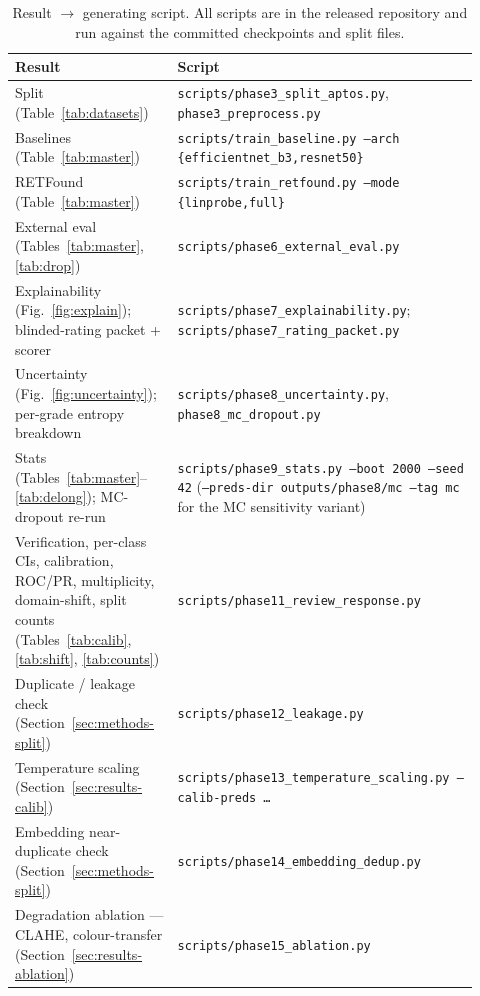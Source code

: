 \documentclass[journal]{IEEEtran}
\begin{document}
\begin{table}[!t]
\centering\footnotesize
\caption{Result $\rightarrow$ generating script. All scripts are in the released
repository and run against the committed checkpoints and split files.}
\label{tab:repro}
\setlength{\tabcolsep}{4pt}
\begin{tabular}{@{}p{0.30\linewidth} p{0.62\linewidth}@{}}
\toprule
Result & Script \\
\midrule
Split (Table~\ref{tab:datasets}) & \texttt{scripts/phase3\_split\_aptos.py}, \texttt{phase3\_preprocess.py} \\
Baselines (Table~\ref{tab:master}) & \texttt{scripts/train\_baseline.py --arch \{efficientnet\_b3,resnet50\}} \\
RETFound (Table~\ref{tab:master}) & \texttt{scripts/train\_retfound.py --mode \{linprobe,full\}} \\
External eval (Tables~\ref{tab:master}, \ref{tab:drop}) & \texttt{scripts/phase6\_external\_eval.py} \\
Explainability (Fig.~\ref{fig:explain}); blinded-rating packet + scorer & \texttt{scripts/phase7\_explainability.py}; \texttt{scripts/phase7\_rating\_packet.py} \\
Uncertainty (Fig.~\ref{fig:uncertainty}); per-grade entropy breakdown & \texttt{scripts/phase8\_uncertainty.py}, \texttt{phase8\_mc\_dropout.py} \\
Stats (Tables~\ref{tab:master}--\ref{tab:delong}); MC-dropout re-run & \texttt{scripts/phase9\_stats.py --boot 2000 --seed 42} \newline (\texttt{--preds-dir outputs/phase8/mc --tag mc} for the MC sensitivity variant) \\
Verification, per-class CIs, calibration, ROC/PR, multiplicity, domain-shift, split counts (Tables~\ref{tab:calib}, \ref{tab:shift}, \ref{tab:counts}) & \texttt{scripts/phase11\_review\_response.py} \\
Duplicate / leakage check (Section~\ref{sec:methods-split}) & \texttt{scripts/phase12\_leakage.py} \\
Temperature scaling (Section~\ref{sec:results-calib}) & \texttt{scripts/phase13\_temperature\_scaling.py --calib-preds \ldots} \\
Embedding near-duplicate check (Section~\ref{sec:methods-split}) & \texttt{scripts/phase14\_embedding\_dedup.py} \\
Degradation ablation --- CLAHE, colour-transfer (Section~\ref{sec:results-ablation}) & \texttt{scripts/phase15\_ablation.py} \\

\end{tabular}
\end{table}
\end{document}
